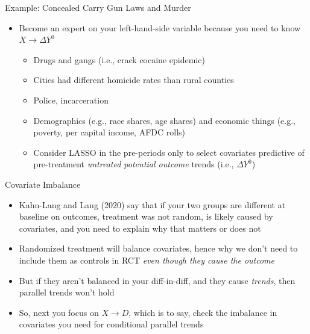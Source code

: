 \documentclass{beamer}
\begin{document}
\begin{frame}{Example: Concealed Carry Gun Laws and Murder}

\begin{itemize}
\item Become an expert on your left-hand-side variable because you need to know $X \rightarrow \Delta Y^0$
	\begin{itemize}
	\item Drugs and gangs (i.e., crack cocaine epidemic)
	\item Cities had different homicide rates than rural counties
	\item Police, incarceration
	\item Demographics (e.g., race shares, age shares) and economic things (e.g., poverty, per capital income, AFDC rolls)
	\item Consider LASSO in the pre-periods only to select covariates predictive of pre-treatment \emph{untreated potential outcome} trends (i.e., $\Delta Y^0$)
	\end{itemize}
\end{itemize}

\end{frame}




\begin{frame}{Covariate Imbalance}
    \begin{itemize}
	\item Kahn-Lang and Lang (2020) say that if your two groups are different at baseline on outcomes, treatment was not random, is likely caused by covariates, and you need to explain why that matters or does not
	\item Randomized treatment will balance covariates, hence why we don't need to include them as controls in RCT \emph{even though they cause the outcome}
	\item But if they aren't balanced in your diff-in-diff, and they cause \emph{trends}, then parallel trends won't hold
\item So, next you focus on $X \rightarrow D$, which is to say, check the imbalance in covariates you need for conditional parallel trends
\end{itemize}
\end{frame}
\end{document}
